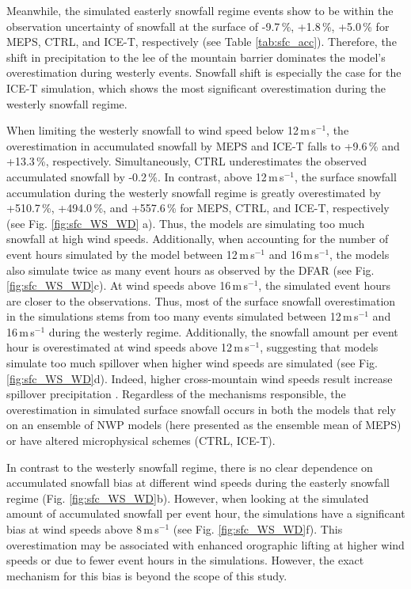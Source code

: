 \documentclass{ametsocV5}
\begin{document}
		Meanwhile, the simulated easterly snowfall regime events show to be within the observation uncertainty of snowfall at the surface of -9.7\,\%, +1.8\,\%, +5.0\,\% for MEPS, CTRL, and ICE-T, respectively (see Table \ref{tab:sfc_acc}). Therefore, the shift in precipitation to the lee of the mountain barrier dominates the model's overestimation during westerly events. Snowfall shift is especially the case for the ICE-T simulation, which shows the most significant overestimation during the westerly snowfall regime. 

		When limiting the westerly snowfall to wind speed below 12\,m\,s$^{-1}$, the overestimation in accumulated snowfall by MEPS and ICE-T falls to +9.6\,\% and +13.3\,\%, respectively. Simultaneously, CTRL underestimates the observed accumulated snowfall by -0.2\,\%. In contrast, above 12\,m\,s$^{-1}$, the surface snowfall accumulation during the westerly snowfall regime is greatly overestimated by +510.7\,\%, +494.0\,\%, and +557.6\,\% for MEPS, CTRL, and ICE-T, respectively (see Fig. \ref{fig:sfc_WS_WD} a). Thus, the models are simulating too much snowfall at high wind speeds. Additionally, when accounting for the number of event hours simulated by the model between 12\,m\,s$^{-1}$ and 16\,m\,s$^{-1}$, the models also simulate twice as many event hours as observed by the DFAR (see Fig. \ref{fig:sfc_WS_WD}c). At wind speeds above 16\,m\,s$^{-1}$, the simulated event hours are closer to the observations. Thus, most of the surface snowfall overestimation in the simulations stems from too many events simulated between 12\,m\,s$^{-1}$ and 16\,m\,s$^{-1}$ during the westerly regime. Additionally, the snowfall amount per event hour is overestimated at wind speeds above 12\,m\,s$^{-1}$, suggesting that models simulate too much spillover when higher wind speeds are simulated (see Fig. \ref{fig:sfc_WS_WD}d). Indeed, higher cross-mountain wind speeds result increase spillover precipitation \citep{chater_atmospheric_1998,kaplan_role_2012}. Regardless of the mechanisms responsible, the overestimation in simulated surface snowfall occurs in both the models that rely on an ensemble of NWP models (here presented as the ensemble mean of MEPS) or have altered microphysical schemes (CTRL, ICE-T). 
		
		In contrast to the westerly snowfall regime, there is no clear dependence on accumulated snowfall bias at different wind speeds during the easterly snowfall regime (Fig. \ref{fig:sfc_WS_WD}b). 
		However, when looking at the simulated amount of accumulated snowfall per event hour, the simulations have a significant bias at wind speeds above 8\,m\,s$^{-1}$ (see Fig. \ref{fig:sfc_WS_WD}f). This overestimation may be associated with enhanced orographic lifting at higher wind speeds or due to fewer event hours in the simulations. However, the exact mechanism for this bias is beyond the scope of this study.
\end{document}
